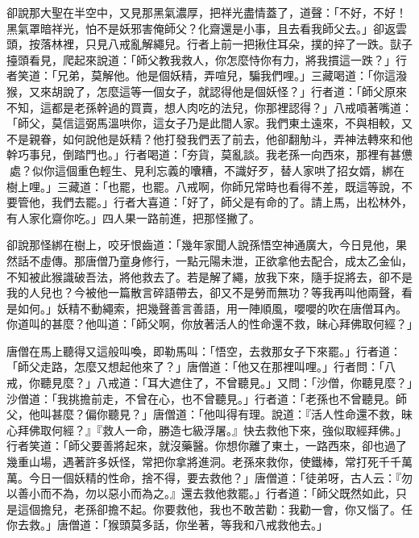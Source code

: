 卻說那大聖在半空中，又見那黑氣濃厚，把祥光盡情蓋了，道聲：「不好，不好！黑氣罩暗祥光，怕不是妖邪害俺師父？化齋還是小事，且去看我師父去。」卻返雲頭，按落林裡，只見八戒亂解繩兒。行者上前一把揪住耳朵，撲的捽了一跌。獃子擡頭看見，爬起來說道：「師父教我救人，你怎麼恃你有力，將我摜這一跌？」行者笑道：「兄弟，莫解他。他是個妖精，弄喧兒，騙我們哩。」三藏喝道：「你這潑猴，又來胡說了，怎麼這等一個女子，就認得他是個妖怪？」行者道：「師父原來不知，這都是老孫幹過的買賣，想人肉吃的法兒，你那裡認得？」八戒嗊著嘴道：「師父，莫信這弼馬溫哄你，這女子乃是此間人家。我們東土遠來，不與相較，又不是親眷，如何說他是妖精？他打發我們丟了前去，他卻翻觔斗，弄神法轉來和他幹巧事兒，倒踏門也。」行者喝道：「夯貨，莫亂談。我老孫一向西來，那裡有甚憊𪬯處？似你這個重色輕生、見利忘義的囔糟，不識好歹，替人家哄了招女婿，綁在樹上哩。」三藏道：「也罷，也罷。八戒啊，你師兄常時也看得不差，既這等說，不要管他，我們去罷。」行者大喜道：「好了，師父是有命的了。請上馬，出松林外，有人家化齋你吃。」四人果一路前進，把那怪撇了。

卻說那怪綁在樹上，咬牙恨齒道：「幾年家聞人說孫悟空神通廣大，今日見他，果然話不虛傳。那唐僧乃童身修行，一點元陽未泄，正欲拿他去配合，成太乙金仙，不知被此猴識破吾法，將他救去了。若是解了繩，放我下來，隨手捉將去，卻不是我的人兒也？今被他一篇散言碎語帶去，卻又不是勞而無功？等我再叫他兩聲，看是如何。」妖精不動繩索，把幾聲善言善語，用一陣順風，嚶嚶的吹在唐僧耳內。你道叫的甚麼？他叫道：「師父啊，你放著活人的性命還不救，昧心拜佛取何經？」

唐僧在馬上聽得又這般叫喚，即勒馬叫：「悟空，去救那女子下來罷。」行者道：「師父走路，怎麼又想起他來了？」唐僧道：「他又在那裡叫哩。」行者問：「八戒，你聽見麼？」八戒道：「耳大遮住了，不曾聽見。」又問：「沙僧，你聽見麼？」沙僧道：「我挑擔前走，不曾在心，也不曾聽見。」行者道：「老孫也不曾聽見。師父，他叫甚麼？偏你聽見？」唐僧道：「他叫得有理。說道：『活人性命還不救，昧心拜佛取何經？』『救人一命，勝造七級浮屠。』快去救他下來，強似取經拜佛。」行者笑道：「師父要善將起來，就沒藥醫。你想你離了東土，一路西來，卻也過了幾重山場，遇著許多妖怪，常把你拿將進洞。老孫來救你，使鐵棒，常打死千千萬萬。今日一個妖精的性命，捨不得，要去救他？」唐僧道：「徒弟呀，古人云：『勿以善小而不為，勿以惡小而為之。』還去救他救罷。」行者道：「師父既然如此，只是這個擔兒，老孫卻擔不起。你要救他，我也不敢苦勸：我勸一會，你又惱了。任你去救。」唐僧道：「猴頭莫多話，你坐著，等我和八戒救他去。」

